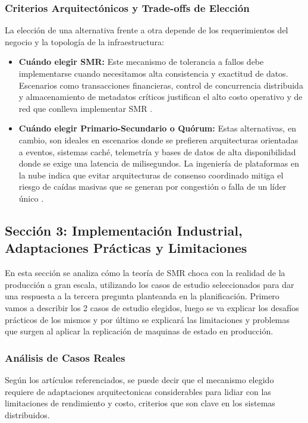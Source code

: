 \documentclass[12pt,letterpaper]{article}
\begin{document}
\subsubsection{Criterios Arquitectónicos y Trade-offs de Elección}

La elección de una alternativa frente a otra depende de los requerimientos del negocio y la topología de la infraestructura:

 \begin{itemize}
 \item \textbf{Cuándo elegir SMR:} Este mecanismo de tolerancia a fallos debe implementarse cuando necesitamos alta consistencia y exactitud de datos. Escenarios como transacciones financieras, control de concurrencia distribuida y almacenamiento de metadatos críticos justifican el alto costo operativo y de red que conlleva implementar SMR \cite{kondru2026, etcd2021}.
 \item \textbf{Cuándo elegir Primario-Secundario o Quórum:} Estas alternativas, en cambio, son ideales en escenarios donde se prefieren arquitecturas orientadas a eventos, sistemas caché, telemetría y bases de datos de alta disponibilidad donde se exige una latencia de milisegundos. La ingeniería de plataformas en la nube indica que evitar arquitecturas de consenso coordinado mitiga el riesgo de caídas masivas que se generan por congestión o falla de un líder único \cite{brooker2020}.
 \end{itemize}


\subsection{Sección 3: Implementación Industrial, Adaptaciones Prácticas y Limitaciones }
En esta sección se analiza cómo la teoría de SMR choca con la realidad de la producción a gran escala, utilizando los casos de estudio seleccionados para dar una respuesta a la tercera pregunta planteanda en la planificación. Primero vamos a describir los 2 casos de estudio elegidos, luego se va explicar los desafíos prácticos de los mismos y por último se explicará las limitaciones y problemas que surgen al aplicar la replicación de maquinas de estado en producción.

\subsubsection{Análisis de Casos Reales}
Según los artículos referenciados, se puede decir que el mecanismo elegido requiere de adaptaciones arquitectonicas considerables para lidiar con las limitaciones de rendimiento y costo, criterios que son clave en los sistemas distribuidos.
\end{document}
